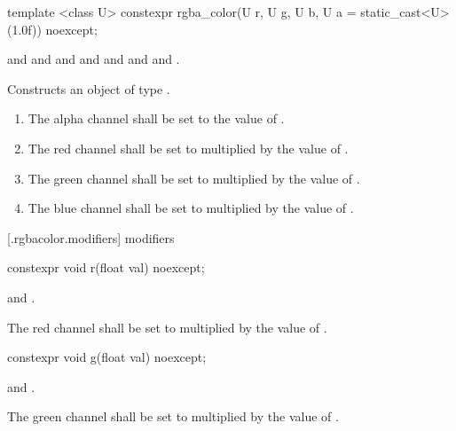 \begin{itemdecl}
template <class U>
constexpr rgba_color(U r, U g, U b, U a = static_cast<U>(1.0f)) noexcept;
\end{itemdecl}
\begin{itemdescr}
\pnum
\requires
{} and  and  and  and  and  and  and .

\pnum
\effects
Constructs an object of type .

\begin{enumerate}
\item The alpha channel shall be set to the value of .
\item The red channel shall be set to  multiplied by the value of  .
\item The green channel shall be set to  multiplied by the value of .
\item The blue channel shall be set to  multiplied by the value of .
\end{enumerate}
\end{itemdescr}


 [\iotwod.rgbacolor.modifiers]{ modifiers}

\begin{itemdecl}
constexpr void r(float val) noexcept;
\end{itemdecl}

\begin{itemdescr}
\pnum
\requires
{} and .

\pnum
\effects
The red channel shall be set to  multiplied by the value of  .
\end{itemdescr}

\begin{itemdecl}
constexpr void g(float val) noexcept;
\end{itemdecl}
\begin{itemdescr}
\pnum
\requires
{} and .

\pnum
\effects
The green channel shall be set to  multiplied by the value of  .
\end{itemdescr}

